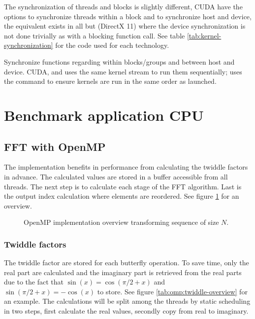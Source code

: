 The synchronization of threads and blocks is slightly different, CUDA have the options to synchronize threads within a block and to synchronize host and device, the equivalent exists in all but {\DX} (DirectX 11) where the device synchronization is not done trivially as with a blocking function call. See table \ref{tab:kernel-synchronization} for the code used for each technology.

\begin{table}[H]
	\centering
	
	\caption{Synchronize functions regarding within blocks/groups and between host and device. CUDA, {\OCL} and {\DX} uses the same kernel stream to run them sequentially; {\GL} uses the command  to ensure kernels are run in the same order as launched.}
	\label{tab:kernel-synchronization}
\end{table}

\section{Benchmark application CPU}

\subsection{FFT with OpenMP}

The {\OMP} implementation benefits in performance from calculating the twiddle factors in advance. The calculated values are stored in a buffer accessible from all threads. The next step is to calculate each stage of the \gls{FFT} algorithm. Last is the output index calculation where elements are reordered. See figure \ref{fig:omp:overview} for an overview.

\begin{figure}
	\centering
	
	\caption{OpenMP implementation overview transforming sequence of size $N$.}
	\label{fig:omp:overview}
\end{figure}

\subsubsection{Twiddle factors}

The twiddle factor are stored for each butterfly operation. To save time, only the real part are calculated and the imaginary part is retrieved from the real parts due to the fact that $\sin(x) = \cos(\pi/2 + x)$ and $\sin(\pi/2 + x) = -\cos(x)$ to store. See figure \ref{tab:omp:twiddle-overview} for an example. The calculations will be split among the threads by static scheduling in two steps, first calculate the real values, secondly copy from real to imaginary.

